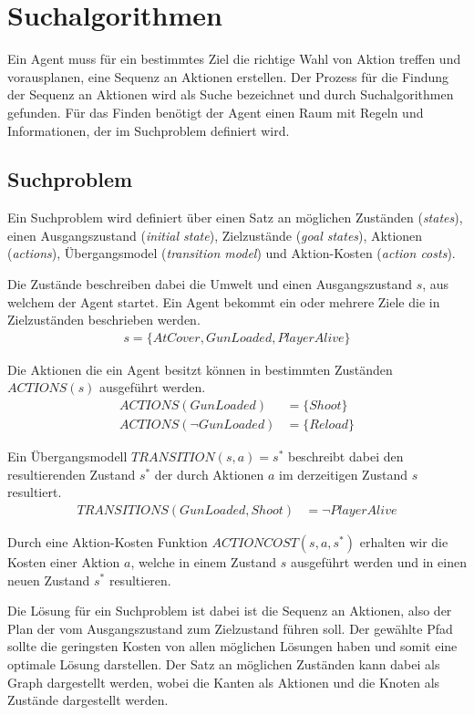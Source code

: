 \chapter{Suchalgorithmen}
Ein Agent muss für ein bestimmtes Ziel die richtige Wahl von Aktion treffen und vorausplanen, eine Sequenz an Aktionen erstellen. Der Prozess für die Findung der Sequenz an Aktionen wird als Suche bezeichnet und durch Suchalgorithmen gefunden. Für das Finden benötigt der Agent einen Raum mit Regeln und Informationen, der im Suchproblem definiert wird.

\section{Suchproblem}
Ein Suchproblem wird definiert über einen Satz an möglichen Zuständen (\textit{states}), einen Ausgangszustand (\textit{initial state}), Zielzustände (\textit{goal states}), Aktionen (\textit{actions}), Übergangsmodel (\textit{transition model}) und Aktion-Kosten (\textit{action costs}).

Die Zustände beschreiben dabei die Umwelt und einen Ausgangszustand $s$, aus welchem der Agent startet. Ein Agent bekommt ein oder mehrere Ziele die in Zielzuständen beschrieben werden.
\begin{align*}
s = \{AtCover, GunLoaded, PlayerAlive\}
\end{align*}

Die Aktionen die ein Agent besitzt können in bestimmten Zuständen $ACTIONS(s)$ ausgeführt werden.
\begin{align*}
ACTIONS(GunLoaded) &= \{Shoot\} \\
ACTIONS(\lnot GunLoaded) &= \{Reload\}
\end{align*}

Ein Übergangsmodell $TRANSITION(s,a) = s^*$ beschreibt dabei den resultierenden Zustand $s^*$ der durch Aktionen $a$ im derzeitigen Zustand $s$ resultiert.
\begin{align*}
TRANSITIONS(GunLoaded, Shoot) &= \lnot PlayerAlive
\end{align*}

Durch eine Aktion-Kosten Funktion $ACTIONCOST(s,a,s^*)$ erhalten wir die Kosten einer Aktion $a$, welche in einem Zustand $s$ ausgeführt werden und in einen neuen Zustand $s^*$ resultieren.

Die Lösung für ein Suchproblem ist dabei ist die Sequenz an Aktionen, also der Plan der vom Ausgangszustand zum Zielzustand führen soll. Der gewählte Pfad sollte die geringsten Kosten von allen möglichen Lösungen haben und somit eine optimale Lösung darstellen. Der Satz an möglichen Zuständen kann dabei als Graph dargestellt werden, wobei die Kanten als Aktionen und die Knoten als Zustände dargestellt werden.

